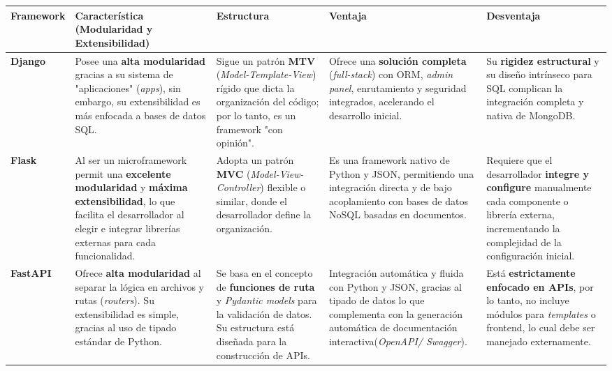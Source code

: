 \begin{tabularx}{\textwidth}{|l|X|X|X|X|}
\hline
\textbf{Framework} & \textbf{Característica (Modularidad y Extensibilidad)} & \textbf{Estructura} & \textbf{Ventaja} & \textbf{Desventaja} \\
\hline
\textbf{Django} \cite{zotero-item-140}& Posee una \textbf{alta modularidad} gracias a su sistema de "aplicaciones" (\textit{apps}), sin embargo, su extensibilidad es más enfocada a bases de datos SQL. & Sigue un patrón \textbf{MTV} (\textit{Model-Template-View}) rígido que dicta la organización del código; por lo tanto, es un framework "con opinión". & Ofrece una \textbf{solución completa} (\textit{full-stack}) con ORM, \textit{admin panel}, enrutamiento y seguridad integrados, acelerando el desarrollo inicial. & Su \textbf{rigidez estructural} y su diseño intrínseco para SQL complican la integración completa y nativa de MongoDB. \\
\hline
\textbf{Flask} \cite{zotero-item-142}& Al ser un microframework permit una \textbf{excelente modularidad} y \textbf{máxima extensibilidad}, lo que facilita el desarrollador al elegir e integrar librerías externas para cada funcionalidad. & Adopta un patrón \textbf{MVC} (\textit{Model-View-Controller}) flexible o similar, donde el desarrollador define la organización. & Es una framework nativo de Python y JSON, permitiendo una integración directa y de bajo acoplamiento con bases de datos NoSQL basadas en documentos. & Requiere que el desarrollador \textbf{integre y configure} manualmente cada componente o librería externa, incrementando la complejidad de la configuración inicial. \\
\hline
\textbf{FastAPI} \cite{zotero-item-144}& Ofrece \textbf{alta modularidad} al separar la lógica en archivos y rutas (\textit{routers}). Su extensibilidad es simple, gracias al uso de tipado estándar de Python. & Se basa en el concepto de \textbf{funciones de ruta} y \textit{Pydantic models} para la validación de datos. Su estructura está diseñada para la construcción de APIs. & Integración automática y fluida con Python y JSON, gracias al tipado de datos lo que complementa con la generación automática de documentación interactiva(\textit{OpenAPI/ Swagger}). & Está \textbf{estrictamente enfocado en APIs}, por lo tanto, no incluye módulos para \textit{templates} o frontend, lo cual debe ser manejado externamente. \\
\hline
\end{tabularx}
\endgroup
